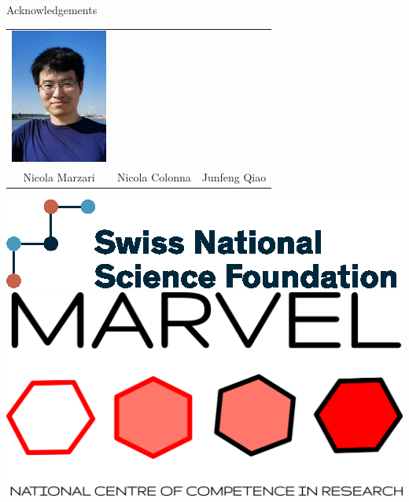 \documentclass[xcolor=table,aspectratio=169]{beamer}
\numberwithin{equation}{section}
\begin{document}
\begin{frame}{Acknowledgements}
\begin{center}
\begin{tabularx}{0.7\textwidth}{CCC}
         \includegraphics[height = 0.3\paperheight]{photos/junfeng.jpeg}           \\
         Nicola Marzari                                                          &
         Nicola Colonna                                                          &
         Junfeng Qiao
      \end{tabularx}
   \end{center}

   \vspace{2ex}

   \begin{center}
      \includegraphics[height = 0.15\paperheight]{logos/SNF_logo_standard_print_color_pos_e.eps}
      \hspace{3em}
      \includegraphics[height = 0.15\paperheight]{figures/marvel_trimmed.png}
   \end{center}


\end{frame}
\end{document}
